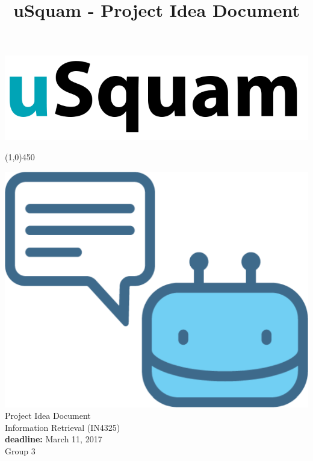 \documentclass[a4paper,dutch,fleqn]{exam}
\title{uSquam - Project Idea Document}
\newcommand{\coursename}{uSquam, a mobile crowdsourcing platform}
\newcommand{\doctitle}{Project Idea Document}
\newcommand{\deadline}{March 11, 2017}
\newcommand{\examdate}{\deadline}
\begin{document}
\thispagestyle{empty}

\begin{center}

\includegraphics[scale=0.3]{image03}
\begin{center}
    \line(1,0){450}
\end{center}

\vspace{2cm}
\includegraphics[scale=0.45]{chatbot}
\vspace{2cm}
{ \Large \\ \doctitle \\ Information Retrieval (IN4325) \\}
\vspace{0.5cm}
{\Large \textbf{deadline:} \examdate \\ \vspace{1cm} Group 3}

\end{center}

\newpage
\end{document}
